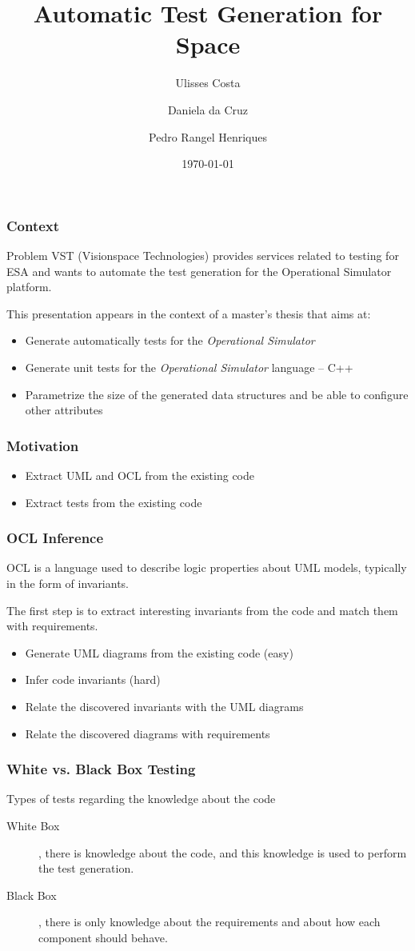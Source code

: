 \documentclass{beamer}
\title{Automatic Test Generation for Space}
\author{Ulisses Costa \and Daniela da Cruz \and Pedro Rangel Henriques}
\institute{SLATE'12 - Symposium on Languages, Applications and Technologies}
\date{\today}
\begin{document}
\begin{frame}
   \titlepage
\end{frame}

\begin{frame}\frametitle{Context}
\begin{block}{Problem}
VST (Visionspace Technologies) provides services related to testing for ESA and wants to automate
the test generation for the Operational Simulator platform.
\end{block}

This presentation appears in the context of a master's thesis that aims at:
\begin{itemize}
\item Generate automatically tests for the \textit{Operational Simulator}
\item Generate unit tests for the \textit{Operational Simulator} language -- C++
\item Parametrize the size of the generated data structures and be able to configure other attributes
\end{itemize}
\end{frame}

\begin{frame}\frametitle{Motivation}
\begin{itemize}
\item Extract UML and OCL from the existing code
\item Extract tests from the existing code
\end{itemize}
\end{frame}

\begin{frame}\frametitle{OCL Inference}
OCL is a language used to describe logic properties about UML models, typically in the form of invariants.

The first step is to extract interesting invariants from the code and match them with requirements.
\begin{itemize}
\item Generate UML diagrams from the existing code (easy)
\item Infer code invariants (hard)
\item Relate the discovered invariants with the UML diagrams
\item Relate the discovered diagrams with requirements
\end{itemize}
\end{frame}

\begin{frame}\frametitle{White vs. Black Box Testing}
\begin{block}{Types of tests regarding the knowledge about the code}
\begin{description}
\item[White Box], there is knowledge about the code, and this knowledge is used to perform the test generation.
\item[Black Box], there is only knowledge about the requirements and about how each component should behave.
\end{description}
\end{block}
\end{frame}
\end{document}
